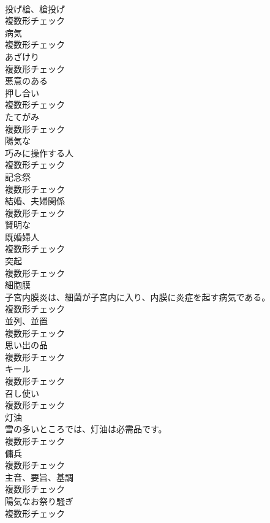 \documentclass[8pt]{extreport}
\begin{document}
\begin{CJK}{UTF8}{min}
\\	[名詞]	投げ槍、槍投げ	
\\	複数形チェック
\\	[名詞]	病気	
\\	複数形チェック
\\	[名詞]	あざけり	
\\	複数形チェック
\\	[形容詞]	悪意のある	
\\	[名詞]	押し合い	
\\	複数形チェック
\\	[名詞]	たてがみ	
\\	複数形チェック
\\	[形容詞]	陽気な	
\\	[名詞]	巧みに操作する人	
\\	複数形チェック
\\	[名詞]	記念祭	
\\	複数形チェック
\\	[名詞]	結婚、夫婦関係	
\\	複数形チェック
\\	[形容詞]	賢明な	
\\	[名詞]	既婚婦人	
\\	複数形チェック
\\	[名詞]	突起	
\\	複数形チェック
\\	[名詞]	細胞膜	
\\	子宮内膜炎は、細菌が子宮内に入り、内膜に炎症を起す病気である。	
\\	複数形チェック
\\	[名詞]	並列、並置	
\\	複数形チェック
\\	[名詞]	思い出の品	
\\	複数形チェック
\\	[名詞]	キール	
\\	複数形チェック
\\	[名詞]	召し使い	
\\	複数形チェック
\\	[名詞]	灯油	
\\	雪の多いところでは、灯油は必需品です。	
\\	複数形チェック
\\	[名詞]	傭兵	
\\	複数形チェック
\\	[名詞]	主音、要旨、基調	
\\	複数形チェック
\\	[名詞]	陽気なお祭り騒ぎ	
\\	複数形チェック

\end{CJK}
\end{document}
